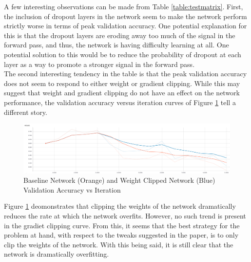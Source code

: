 \documentclass{article}
\begin{document}
    A few interesting observations can be made from Table \ref{table:testmatrix}.
    First, the inclusion of dropout layers in the network seem to make the network perform strictly worse in terms of peak validation accuracy.
    One potential explanation for this is that the dropout layers are eroding away too much of the signal in the forward pass, and thus, the network is having difficulty learning at all.
    One potential solution to this would be to reduce the probability of dropout at each layer as a way to promote a stronger signal in the forward pass.\\[6pt]

    The second interesting tendency in the table is that the peak validation accuracy does not seem to respond to either weight or gradient clipping.
    While this may suggest that weight and gradient clipping do not have an effect on the network performance, the validation accuracy versus iteration curves of Figure \ref{figure:overfit} tell a different story.

    \begin{figure}[h!]
      \includegraphics[scale=.33]{img1.png}
      \caption{Baseline Network (Orange) and Weight Clipped Network (Blue) Validation Accuracy vs Iteration} \label{figure:overfit}
    \end{figure}

    Figure \ref{figure:overfit} deomonstrates that clipping the weights of the network dramatically reduces the rate at which the network overfits.
    However, no such trend is present in the gradiet clipping curve.
    From this, it seems that the best strategy for the problem at hand, with respect to the tweaks suggested in the paper, is to only clip the weights of the network.
    With this being said, it is still clear that the network is dramatically overfitting.\\[6pt]
\end{document}
